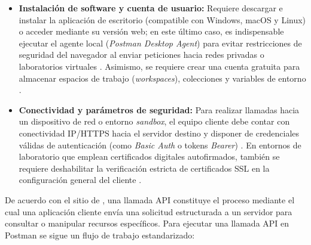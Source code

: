 \documentclass[12pt,a4paper]{article}
\begin{document}
\begin{itemize}
    \item \textbf{Instalación de software y cuenta de usuario:} Requiere descargar e instalar la aplicación de escritorio (compatible con Windows, macOS y Linux) o acceder mediante su versión web; en este último caso, es indispensable ejecutar el agente local (\textit{Postman Desktop Agent}) para evitar restricciones de seguridad del navegador al enviar peticiones hacia redes privadas o laboratorios virtuales \parencite{geeksforgeeks_postman, freecodecamp_postman}. Asimismo, se requiere crear una cuenta gratuita para almacenar espacios de trabajo (\textit{workspaces}), colecciones y variables de entorno \parencite{postman_product}.
    \item \textbf{Conectividad y parámetros de seguridad:} Para realizar llamadas hacia un dispositivo de red o entorno \textit{sandbox}, el equipo cliente debe contar con conectividad IP/HTTPS hacia el servidor destino y disponer de credenciales válidas de autenticación (como \textit{Basic Auth} o tokens \textit{Bearer}) \parencite{freecodecamp_postman, cisco_devnet}. En entornos de laboratorio que emplean certificados digitales autofirmados, también se requiere deshabilitar la verificación estricta de certificados SSL en la configuración general del cliente \parencite{cisco_devnet}.
\end{itemize}

De acuerdo con el sitio de \textcite{postman_apicall}, una llamada API constituye el proceso mediante el cual una aplicación cliente envía una solicitud estructurada a un servidor para consultar o manipular recursos específicos. Para ejecutar una llamada API en Postman se sigue un flujo de trabajo estandarizado:
\end{document}
